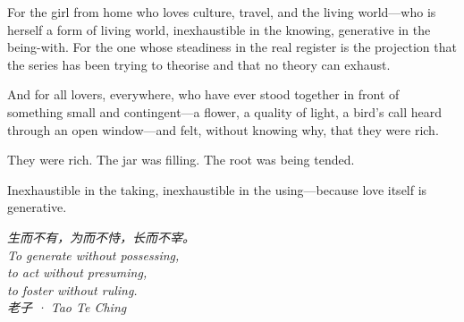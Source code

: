 \vspace{0.5em}

\noindent
{}

\vspace{0.5em}

\noindent
For the girl from home who loves culture, travel, and the living world---who is herself a form of living world, inexhaustible in the knowing, generative in the being-with. For the one whose steadiness in the real register is the projection that the series has been trying to theorise and that no theory can exhaust.

\vspace{0.5em}

\noindent
And for all lovers, everywhere, who have ever stood together in front of something small and contingent---a flower, a quality of light, a bird's call heard through an open window---and felt, without knowing why, that they were rich.

\vspace{0.5em}

\noindent
They were rich. The jar was filling. The root was being tended.

\vspace{0.5em}

\noindent
{}

\vspace{0.5em}

\noindent
Inexhaustible in the taking, inexhaustible in the using---because love itself is generative.

\vspace{2em}
\goldrule

\vspace{1.5em}
\begin{center}
\begin{minipage}{0.72\linewidth}
\centering\itshape\color{rose}
{\cjk 生而不有，为而不恃，长而不宰。}\\[0.5em]
\upshape To generate without possessing,\\[0.2em]
to act without presuming,\\[0.2em]
to foster without ruling.\\[0.8em]
{\footnotesize\color{gold} {\cjk 老子} · \emph{Tao Te Ching}}
\end{minipage}
\end{center}

\vspace{1.5em}
\goldrule
